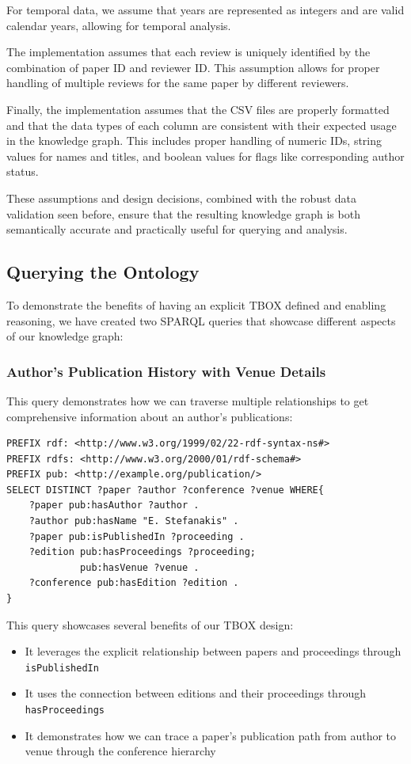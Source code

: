 \documentclass[10pt,a4paper]{article}
\begin{document}
For temporal data, we assume that years are represented as integers and are valid calendar years, allowing for temporal analysis.

The implementation assumes that each review is uniquely identified by the combination of paper ID and reviewer ID. This assumption allows for proper handling of multiple reviews for the same paper by different reviewers.

Finally, the implementation assumes that the CSV files are properly formatted and that the data types of each column are consistent with their expected usage in the knowledge graph. This includes proper handling of numeric IDs, string values for names and titles, and boolean values for flags like corresponding author status.

These assumptions and design decisions, combined with the robust data validation seen before, ensure that the resulting knowledge graph is both semantically accurate and practically useful for querying and analysis.

\subsection{Querying the Ontology}

To demonstrate the benefits of having an explicit TBOX defined and enabling reasoning, we have created two SPARQL queries that showcase different aspects of our knowledge graph:

\subsubsection{Author's Publication History with Venue Details}
This query demonstrates how we can traverse multiple relationships to get comprehensive information about an author's publications:

\begin{verbatim}
PREFIX rdf: <http://www.w3.org/1999/02/22-rdf-syntax-ns#>
PREFIX rdfs: <http://www.w3.org/2000/01/rdf-schema#>
PREFIX pub: <http://example.org/publication/>
SELECT DISTINCT ?paper ?author ?conference ?venue WHERE{
    ?paper pub:hasAuthor ?author .
    ?author pub:hasName "E. Stefanakis" .
    ?paper pub:isPublishedIn ?proceeding .
    ?edition pub:hasProceedings ?proceeding;
             pub:hasVenue ?venue .
    ?conference pub:hasEdition ?edition .
}
\end{verbatim}

This query showcases several benefits of our TBOX design:
\begin{itemize}
    \item It leverages the explicit relationship between papers and proceedings through \texttt{isPublishedIn}
    \item It uses the connection between editions and their proceedings through \texttt{hasProceedings}
    \item It demonstrates how we can trace a paper's publication path from author to venue through the conference hierarchy
\end{itemize}
\end{document}
